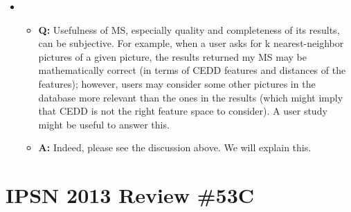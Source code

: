 \begin{itemize}
\item
\begin{itemize}
\item \textbf{Q: } Usefulness of MS, especially quality and
  completeness of its results, can be subjective. For example, when a
  user asks for k nearest-neighbor pictures of a given picture, the
  results returned my MS may be mathematically correct (in terms of
  CEDD features and distances of the features); however, users may
  consider some other pictures in the database more relevant than the
  ones in the results (which might imply that CEDD is not the right
  feature space to consider). A user study might be useful to answer
  this.
\item \textbf{A: } Indeed, please see the discussion above. We will
  explain this.
\end{itemize}
\end{itemize}
 \section{IPSN 2013 Review \#53C}
                 
